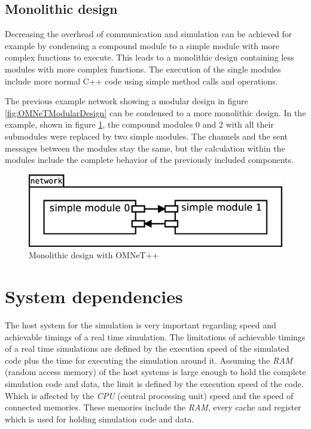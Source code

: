 \documentclass[journal]{IEEEtran}
\begin{document}
\subsection{Monolithic design}
Decreasing the overhead of communication and simulation can be achieved for example by condensing a compound module to a simple module with more complex functions to execute.
This leads to a monolithic design containing less modules with more complex functions.
The execution of the single modules include more normal C++ code using simple method calls and operations.

The previous example network showing a modular design in figure \ref{fig:OMNeTModularDesign} can be condensed to a more monolithic design.
In the example, shown in figure \ref{fig:OMNeTMonolithicDesign}, the compound modules 0 and 2 with all their submodules were replaced by two simple modules.
The channels and the sent messages between the modules stay the same, but the calculation within the modules include the complete behavior of the previously included components.

\begin{figure}
    \centering
    \includegraphics[width=0.9\columnwidth]{OMNeTMonolithicDesign.eps}
    \caption{Monolithic design with OMNeT++}
    \label{fig:OMNeTMonolithicDesign}
\end{figure}

\section{System dependencies}
\label{sec:SystemDependencies}
The host system for the simulation is very important regarding speed and achievable timings of a real time simulation.
The limitations of achievable timings of a real time simulations are defined by the execution speed of the simulated code plus the time for executing the simulation around it.
Assuming the \emph{RAM} (random access memory) of the host systems is large enough to hold the complete simulation code and data, the limit is defined by the execution speed of the code.
Which is affected by the \emph{CPU} (central processing unit) speed and the speed of connected memories.
These memories include the \emph{RAM}, every cache and register which is used for holding simulation code and data.
\end{document}
